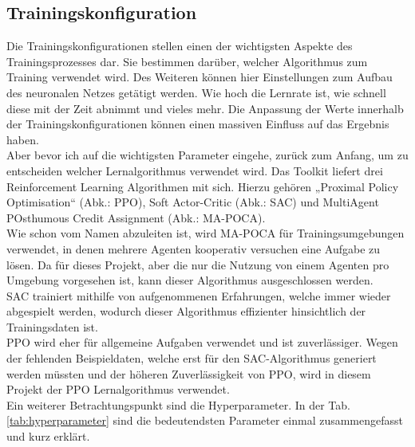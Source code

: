 \subsection{Trainingskonfiguration}
Die Trainingskonfigurationen stellen einen der wichtigsten Aspekte des Trainingsprozesses dar. Sie bestimmen darüber, welcher Algorithmus zum Training verwendet wird. Des Weiteren können hier Einstellungen zum Aufbau des neuronalen Netzes getätigt werden. Wie hoch die Lernrate ist, wie schnell diese mit der Zeit abnimmt und vieles mehr. Die Anpassung der Werte innerhalb der Trainingskonfigurationen können einen massiven Einfluss auf das Ergebnis haben. 
\\
Aber bevor ich auf die wichtigsten Parameter eingehe, zurück zum Anfang, um zu entscheiden welcher Lernalgorithmus verwendet wird. Das Toolkit liefert drei Reinforcement Learning Algorithmen mit sich. Hierzu gehören „Proximal Policy Optimisation“ (Abk.: PPO), Soft Actor-Critic (Abk.: SAC) und MultiAgent POsthumous Credit Assignment (Abk.: MA-POCA). 
\\
Wie schon vom Namen abzuleiten ist, wird MA-POCA für Trainingsumgebungen verwendet, in denen mehrere Agenten kooperativ versuchen eine Aufgabe zu lösen. Da für dieses Projekt, aber die nur die Nutzung von einem Agenten pro Umgebung vorgesehen ist, kann dieser Algorithmus ausgeschlossen werden.\cite{mapoca}
\\
SAC trainiert mithilfe von aufgenommenen Erfahrungen, welche immer wieder abgespielt werden, wodurch dieser Algorithmus effizienter hinsichtlich der Trainingsdaten ist.\cite{sac}
\\
PPO wird eher für allgemeine Aufgaben verwendet und ist zuverlässiger.\cite{mapoca} Wegen der fehlenden Beispieldaten, welche erst für den SAC-Algorithmus generiert werden müssten und der höheren Zuverlässigkeit von PPO, wird in diesem Projekt der PPO Lernalgorithmus verwendet.
\\
Ein weiterer Betrachtungspunkt sind die Hyperparameter. In der Tab.\ref{tab:hyperparameter} sind die bedeutendsten Parameter einmal zusammengefasst und kurz erklärt. 
